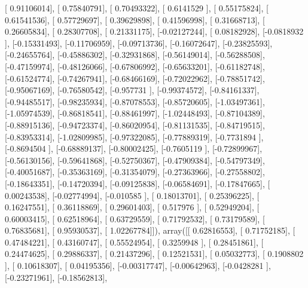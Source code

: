 \documentclass{article}
\begin{document}
       [ 0.91106014],
       [ 0.75840791],
       [ 0.70493322],
       [ 0.6141529 ],
       [ 0.55175824],
       [ 0.61541536],
       [ 0.57729697],
       [ 0.39629898],
       [ 0.41596998],
       [ 0.31668713],
       [ 0.26605834],
       [ 0.28307708],
       [ 0.21331175],
       [-0.02127244],
       [ 0.08182928],
       [-0.0818932 ],
       [-0.15331493],
       [-0.11706959],
       [-0.09713736],
       [-0.16072647],
       [-0.23825593],
       [-0.24655764],
       [-0.45886302],
       [-0.32931868],
       [-0.56149014],
       [-0.56288508],
       [-0.47159974],
       [-0.48126066],
       [-0.67806992],
       [-0.65633201],
       [-0.61182748],
       [-0.61524774],
       [-0.74267941],
       [-0.68466169],
       [-0.72022962],
       [-0.78851742],
       [-0.95067169],
       [-0.76580542],
       [-0.957731  ],
       [-0.99374572],
       [-0.84161337],
       [-0.94485517],
       [-0.98235934],
       [-0.87078553],
       [-0.85720605],
       [-1.03497361],
       [-1.05974539],
       [-0.86818541],
       [-0.88461997],
       [-1.02448493],
       [-0.87104389],
       [-0.88915136],
       [-0.94723374],
       [-0.86020954],
       [-0.81131535],
       [-0.84719515],
       [-0.83953314],
       [-1.02809985],
       [-0.97322085],
       [-0.77889319],
       [-0.7731894 ],
       [-0.8694504 ],
       [-0.68889137],
       [-0.80002425],
       [-0.7605119 ],
       [-0.72899967],
       [-0.56130156],
       [-0.59641868],
       [-0.52750367],
       [-0.47909384],
       [-0.54797349],
       [-0.40051687],
       [-0.35363169],
       [-0.31354079],
       [-0.27363966],
       [-0.27558802],
       [-0.18643351],
       [-0.14720394],
       [-0.09125838],
       [-0.06584691],
       [-0.17847665],
       [ 0.00243538],
       [-0.02774994],
       [-0.010585  ],
       [ 0.18013701],
       [ 0.25396225],
       [ 0.16247551],
       [ 0.36118869],
       [ 0.29601403],
       [ 0.517976  ],
       [ 0.52949204],
       [ 0.60003415],
       [ 0.62518964],
       [ 0.63729559],
       [ 0.71792532],
       [ 0.73179589],
       [ 0.76835681],
       [ 0.95930537],
       [ 1.02267784]]), array([[ 0.62816553],
       [ 0.71752185],
       [ 0.47484221],
       [ 0.43160747],
       [ 0.55524954],
       [ 0.3259948 ],
       [ 0.28451861],
       [ 0.24474625],
       [ 0.29886337],
       [ 0.21437296],
       [ 0.12521531],
       [ 0.05032773],
       [ 0.1908802 ],
       [ 0.10618307],
       [ 0.04195356],
       [-0.00317747],
       [-0.00642963],
       [-0.0428281 ],
       [-0.23271961],
       [-0.18562813],
\end{document}
